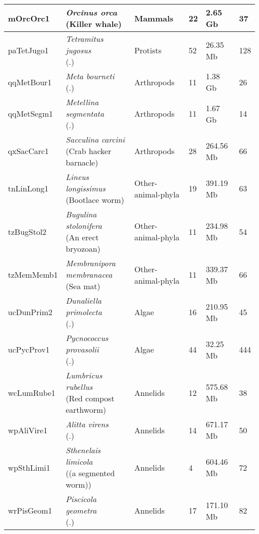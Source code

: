 \begin{centering}
\begin{longtable}{l|l|l|l|l|l}
mOrcOrc1 & \makecell[{l}]{\textit{Orcinus orca} \\ (Killer whale)} & Mammals & 22 & 2.65 Gb & 37  \\ \hline
paTetJugo1 & \makecell[{l}]{\textit{Tetramitus jugosus} \\ (.)} & Protists & 52 & 26.35 Mb & 128  \\ \hline
qqMetBour1 & \makecell[{l}]{\textit{Meta bourneti} \\ (.)} & Arthropods & 11 & 1.38 Gb & 26  \\ \hline
qqMetSegm1 & \makecell[{l}]{\textit{Metellina segmentata} \\ (.)} & Arthropods & 11 & 1.67 Gb & 14  \\ \hline
qxSacCarc1 & \makecell[{l}]{\textit{Sacculina carcini} \\ (Crab hacker barnacle)} & Arthropods & 28 & 264.56 Mb & 66  \\ \hline
tnLinLong1 & \makecell[{l}]{\textit{Lineus longissimus} \\ (Bootlace worm)} & Other-animal-phyla & 19 & 391.19 Mb & 63  \\ \hline
tzBugStol2 & \makecell[{l}]{\textit{Bugulina stolonifera} \\ (An erect bryozoan)} & Other-animal-phyla & 11 & 234.98 Mb & 54  \\ \hline
tzMemMemb1 & \makecell[{l}]{\textit{Membranipora membranacea} \\ (Sea mat)} & Other-animal-phyla & 11 & 339.37 Mb & 66  \\ \hline
ucDunPrim2 & \makecell[{l}]{\textit{Dunaliella primolecta} \\ (.)} & Algae & 16 & 210.95 Mb & 45  \\ \hline
ucPycProv1 & \makecell[{l}]{\textit{Pycnococcus provasolii} \\ (.)} & Algae & 44 & 32.25 Mb & 444  \\ \hline
wcLumRube1 & \makecell[{l}]{\textit{Lumbricus rubellus} \\ (Red compost earthworm)} & Annelids & 12 & 575.68 Mb & 38  \\ \hline
wpAliVire1 & \makecell[{l}]{\textit{Alitta virens} \\ (.)} & Annelids & 14 & 671.17 Mb & 50  \\ \hline
wpSthLimi1 & \makecell[{l}]{\textit{Sthenelais limicola} \\ ((a segmented worm))} & Annelids & 4 & 604.46 Mb & 72  \\ \hline
wrPisGeom1 & \makecell[{l}]{\textit{Piscicola geometra} \\ (.)} & Annelids & 17 & 171.10 Mb & 82  \\ \hline

\end{longtable}
\end{centering}
